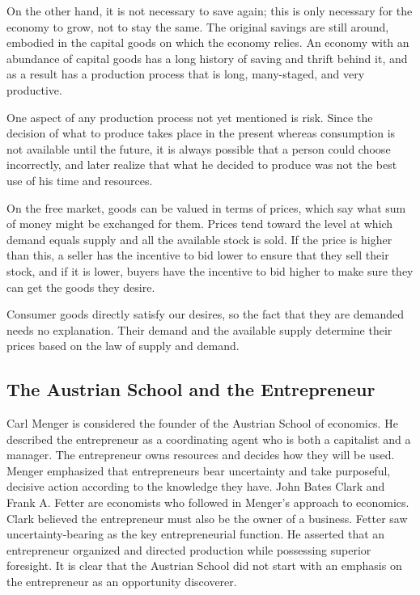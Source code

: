 On the other hand, it is not necessary to save again; this is only necessary for the economy to grow, not to stay the same. The original savings are still around, embodied in the capital goods on which the economy relies. An economy with an abundance of capital goods has a long history of saving and thrift behind it, and as a result has a production process that is long, many-staged, and very productive.

One aspect of any production process not yet mentioned is risk. Since the decision of what to produce takes place in the present whereas consumption is not available until the future, it is always possible that a person could choose incorrectly, and later realize that what he decided to produce was not the best use of his time and resources.

On the free market, goods can be valued in terms of prices, which say what sum of money might be exchanged for them. Prices tend toward the level at which demand equals supply and all the available stock is sold. If the price is higher than this, a seller has the incentive to bid lower to ensure that they sell their stock, and if it is lower, buyers have the incentive to bid higher to make sure they can get the goods they desire.

Consumer goods directly satisfy our desires, so the fact that they are demanded needs no explanation. Their demand and the available supply determine their prices based on the law of supply and demand.

\subsection{The Austrian School and the Entrepreneur}

Carl Menger is considered the founder of the Austrian School of economics. He described the entrepreneur as a coordinating agent who is both a capitalist and a manager. The entrepreneur owns resources and decides how they will be used. Menger emphasized that entrepreneurs bear uncertainty and take purposeful, decisive action according to the knowledge they have. John Bates Clark and Frank A. Fetter are economists who followed in Menger's approach to economics. Clark believed the entrepreneur must also be the owner of a business. Fetter saw uncertainty-bearing as the key entrepreneurial function. He asserted that an entrepreneur organized and directed production while possessing superior foresight. It is clear that the Austrian School did not start with an emphasis on the entrepreneur as an opportunity discoverer.


